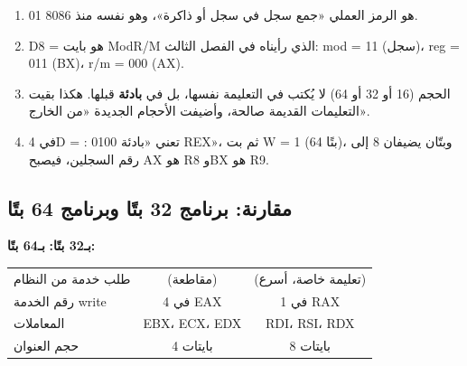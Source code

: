 \begin{khatwa}
    \begin{enumerate}
        \item \textenglish{01} هو الرمز العملي «جمع سجل في سجل أو ذاكرة»، وهو نفسه منذ \textenglish{8086}.
        \item \textenglish{D8} =  هو بايت \textenglish{ModR/M} الذي رأيناه في الفصل الثالث: \textenglish{mod = 11} (سجل)،
              \textenglish{reg = 011} (\textenglish{BX})، \textenglish{r/m = 000} (\textenglish{AX}).
        \item الحجم (16 أو 32 أو 64) لا يُكتب في التعليمة نفسها، بل في \textbf{بادئة} قبلها. هكذا بقيت التعليمات القديمة
              صالحة، وأضيفت الأحجام الجديدة «من الخارج».
        \item في \textenglish{4D} = : \textenglish{0100} تعني «بادئة \textenglish{REX}»، ثم بت \textenglish{W = 1} (64 بتًا)، وبتّان
              يضيفان 8 إلى رقم السجلين، فيصبح \textenglish{AX} هو \textenglish{R8} و\textenglish{BX} هو \textenglish{R9}.
    \end{enumerate}
\end{khatwa}

\subsection{مقارنة: برنامج 32 بتًا وبرنامج 64 بتًا}
\textbf{بـ32 بتًا:}
\textbf{بـ64 بتًا:}

\begin{center}
\small
\begin{tabularx}{\linewidth}{|>{\centering\arraybackslash}p{3.6cm}|C|C|}
    \hline
    \ras{} &  &  \\ \hline
    طلب خدمة من النظام &  (مقاطعة) &  (تعليمة خاصة، أسرع) \\ \hline
    رقم الخدمة \textenglish{write} & 4 في \textenglish{EAX} & 1 في \textenglish{RAX} \\ \hline
    المعاملات & \textenglish{EBX}، \textenglish{ECX}، \textenglish{EDX} & \textenglish{RDI}، \textenglish{RSI}، \textenglish{RDX} \\ \hline
    حجم العنوان & 4 بايتات & 8 بايتات \\ \hline
\end{tabularx}
\end{center}

